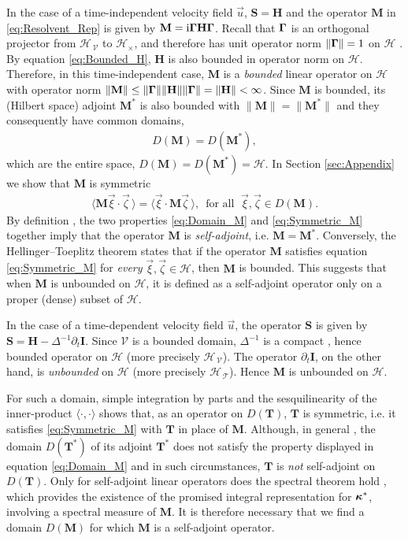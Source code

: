 \documentclass[11pt]{amsart}
\newcommand{\I}{\mathrm{i}}
\newcommand{\Mb}{\mathbf{M}}
\newcommand{\Tb}{\mathbf{T}}
\newcommand{\Hb}{\mathbf{H}}
\newcommand{\Ib}{\mathbf{I}}
\newcommand{\Sb}{\mathbf{S}}
\newcommand{\Tc}{\mathcal{T}}
\newcommand{\Vc}{\mathcal{V}}
\newcommand{\Hs}{\mathscr{H}}
\newcommand\bkappa{\mbox{\boldmath${\kappa}$}}
\newcommand\bGamma{\mbox{\boldmath${\Gamma}$}}
\begin{document}
In the case of a time-independent velocity field $\vec{u}$, $\Sb=\Hb$
and the operator $\Mb$ in \eqref{eq:Resolvent_Rep} is given by
$\Mb=\I\bGamma\Hb\bGamma$. Recall that $\bGamma$ is an orthogonal
projector from $\Hs_{\,\Vc}$ to $\Hs_\times$, and therefore has unit operator
norm $\|\bGamma\|=1$ on $\Hs$ \cite{Reed-1980,Stone:64}. By equation
\eqref{eq:Bounded_H}, $\Hb$ is also bounded in operator
norm on $\Hs$. Therefore, in this time-independent case, $\Mb$ is a
\emph{bounded} linear operator on $\Hs$ with operator norm 
$\|\Mb\|\leq\|\bGamma\|\|\Hb\|\|\bGamma\|=\|\Hb\|<\infty$. Since $\Mb$ is bounded, its
(Hilbert space) adjoint $\Mb^*$ is also bounded with 
$\|\Mb\|=\|\Mb^*\|$ \cite{Reed-1980} and they consequently have common
domains, 
%
\begin{align}\label{eq:Domain_M}
  D(\Mb)=D(\Mb^*),
\end{align}
%
which are the entire space, $D(\Mb)=D(\Mb^*)=\Hs$. In
Section \ref{sec:Appendix} we show that $\Mb$ is symmetric  
%
\begin{align}\label{eq:Symmetric_M}
  \langle\Mb\vec{\xi}\cdot\vec{\zeta}\,\rangle=\langle\vec{\xi}\cdot\Mb\vec{\zeta}\,\rangle,
  \, \text{ for all } \; \vec{\xi},\vec{\zeta}\in D(\Mb).
\end{align}
%
By definition \cite{Reed-1980}, the two properties \eqref{eq:Domain_M}
and \eqref{eq:Symmetric_M} together imply that the operator $\Mb$ is
\emph{self-adjoint}, i.e. $\Mb=\Mb^*$. Conversely, the
Hellinger--Toeplitz theorem \cite{Reed-1980} states that if the
operator $\Mb$ satisfies equation \eqref{eq:Symmetric_M} 
for \emph{every} $\vec{\xi},\vec{\zeta}\in\Hs$, then $\Mb$ is bounded. This
suggests that when $\Mb$ is unbounded on $\Hs$, it is defined as a 
self-adjoint operator only on a proper (dense) subset of $\Hs$. 




In the case of a time-dependent velocity field $\vec{u}$, the operator
$\Sb$ is given by $\Sb=\Hb-\Delta^{-1}\partial_t\Ib$. Since $\Vc$ is a bounded
domain, $\Delta^{-1}$ is a compact \cite{Stakgold:BVP:2000},
hence bounded operator on $\Hs$ (more precisely $\Hs_{\,\Vc}$). The
operator $\partial_t\Ib$, on the other hand, is \emph{unbounded}
\cite{Reed-1980,Stone:64} on $\Hs$ 
(more precisely $\Hs_{\,\Tc}$). Hence $\Mb$ is unbounded on $\Hs$. 




 
For such a domain, simple integration by parts and the sesquilinearity 
of the inner-product $\langle\cdot,\cdot\rangle$ shows that, as an operator on $D(\Tb)$,
$\Tb$ is symmetric, i.e. it satisfies \eqref{eq:Symmetric_M} with
$\Tb$ in place of $\Mb$. Although, in general \cite{Reed-1980}, the
domain $D(\Tb^*)$ of its adjoint $\Tb^*$ does not satisfy the property
displayed in equation \eqref{eq:Domain_M} and in such circumstances,
$\Tb$ is \emph{not} self-adjoint on $D(\Tb)$. Only for self-adjoint
linear operators does the spectral theorem hold \cite{Reed-1980},
which provides the existence of the promised integral representation
for $\bkappa^*$, involving a spectral measure of $\Mb$. It is therefore
necessary that we find a domain $D(\Mb)$ for which $\Mb$ is a
self-adjoint operator.   
\end{document}
